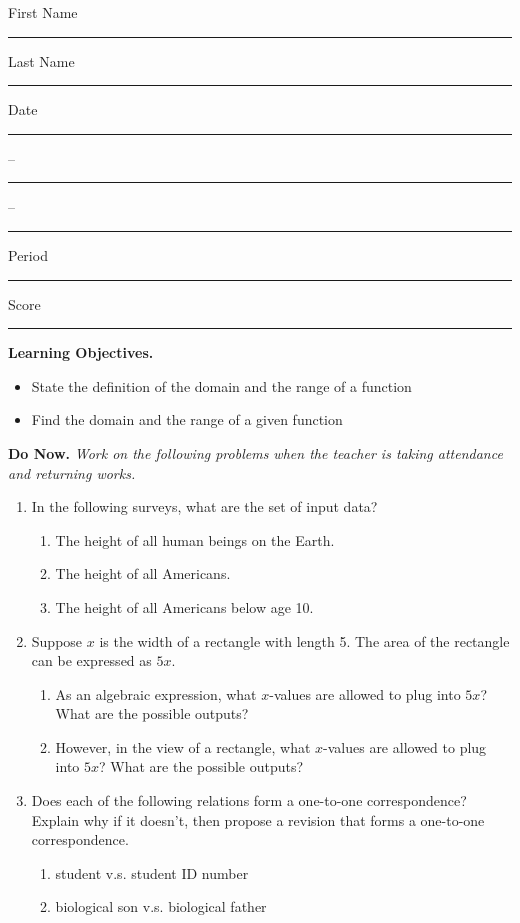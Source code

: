 \documentclass[twoside, 10pt]{article}
\title{}
\date{}
\begin{document}
\noindent
{\large
First Name \rule{6em}{.1pt}Last Name \rule{6em}{.1pt} Date \rule{1.5em}{.1pt} -- \rule{1.5em}{.1pt} -- \rule{1.5em}{.1pt} Period \rule{2em}{.1pt} Score \rule{2em}{.1pt}
}
\vspace{1em}

{\noindent \bf Learning Objectives.}
\begin{itemize}
\item State the definition of the domain and the range of a function
\item Find the domain and the range of a given function
\end{itemize}
{\noindent\bf Do Now.} {\it Work on the following problems when the teacher is taking attendance and returning works.}
\begin{enumerate}
\item In the following surveys, what are the set of input data?
\begin{enumerate}
\item
The height of all human beings on the Earth.
\item The height of all Americans.
\item The height of all Americans below age 10.
\end{enumerate}
\item Suppose $x$ is the width of a rectangle with length 5. The area of the rectangle can be expressed as $5x$.
\begin{enumerate}
\item
As an algebraic expression, what $x$-values are allowed to plug into $5x$? What are the possible outputs?
\item 
However, in the view of a rectangle, what $x$-values are allowed to plug into $5x$? What are the possible outputs?
\end{enumerate}
\item Does each of the following relations form a one-to-one correspondence? Explain why if it doesn't, then propose a revision that forms a  one-to-one correspondence.
\begin{enumerate}
\item student v.s. student ID number
\item biological son v.s. biological father
\end{enumerate}

\end{enumerate}
\end{document}
